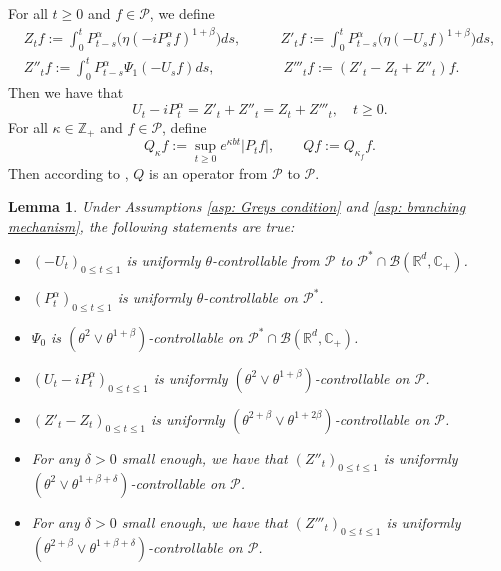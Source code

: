\documentclass[12pt,a4paper]{amsart}
\theoremstyle{plain}
\newtheorem{lem}[thm]{Lemma}
\theoremstyle{definition}
\numberwithin{equation}{section}
\begin{document}
For all $t\geq 0$ and $f\in \mathcal P$, we define
\begin{align}
  \label{eq: def of Zf}
  Z_t f
    := \int_0^t P^\alpha_{t-s}\big( \eta (-i P^\alpha_sf)^{1+\beta}\big)ds,
    & \qquad Z'_t f
    := \int_0^t P^\alpha_{t-s}\big( \eta (-U_s f)^{1+\beta}\big)ds,\\
   Z''_t f
    := \int_0^t P^\alpha_{t-s}\Psi_1(-U_s f)ds,
    &\qquad\  Z'''_t f
    := (Z'_t - Z_t+ Z''_t)f.
\end{align}
Then we have that
\begin{equation}
  \label{eq: key equality}
  U_t - i P^\alpha_t
  = Z'_t + Z''_t
  = Z_t + Z'''_t
  , \quad t\geq 0.
\end{equation}
For all $\kappa \in \mathbb Z_+$ and $f\in \mathcal P$, define
\begin{equation}
  \label{Q_k}
  Q_\kappa f
  := \sup_{t\geq 0} e^{\kappa b t}|P_t f|, 
  \qquad  Q f
  := Q_{\kappa_f}f.
\end{equation}
Then according to \cite[Fact 1.2]{MarksMilos2018CLT}, $Q$ is an operator from $\mathcal P$ to $\mathcal P$.

\begin{lem}
  \label{lem: upper bound for usgx}
  Under Assumptions \ref{asp: Greys condition} and \ref{asp: branching mechanism}, the following statements are true:
  \begin{itemize}
  \item[(1)]
    $(-U_t)_{0\leq t\leq 1}$ is uniformly $\theta$-controllable from $\mathcal P$ to $\mathcal P^*\cap \mathcal B(\mathbb R^d, \mathbb C_+)$.
  \item[(2)]
    $(P^\alpha_t)_{0\leq t\leq 1}$ is uniformly $\theta$-controllable on $\mathcal P^*$.
  \item[(3)]
    $\Psi_0$ is $(\theta^2\vee \theta^{1+\beta})$-controllable on $\mathcal P^* \cap \mathcal B(\mathbb R^d, \mathbb C_+)$.
  \item[(4)]
    $(U_t- iP_t^{\alpha})_{0\leq t\leq 1}$ is uniformly $(\theta^2\vee \theta^{1+\beta})$-controllable on $\mathcal P$.
  \item[(5)]
    $(Z'_t-Z_t)_{0\leq t\leq 1}$ is uniformly $(\theta^{2+\beta}\vee \theta^{1+2\beta})$-controllable on $\mathcal P$.
  \item[(6)]
    For any $\delta > 0$ small enough, we have that $(Z''_t)_{0\leq t\leq 1}$ is uniformly $(\theta^2\vee \theta^{1+\beta+\delta})$-controllable on $\mathcal P$.
  \item[(7)]
    For any $\delta > 0$ small enough, we have that $(Z'''_t)_{0\leq t\leq 1}$ is uniformly $(\theta^{2+\beta}\vee \theta^{1+\beta+\delta})$-controllable on $\mathcal P$.
  \end{itemize}
\end{lem}
\end{document}
